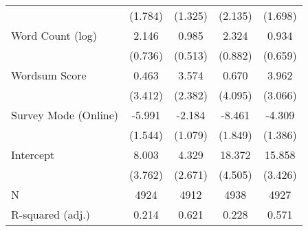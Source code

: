 \begin{table}[h]
\begin{tabular}{lcccc}
   & (1.784) & (1.325) & (2.135) & (1.698) \\ 
  Word Count (log) &   2.146 &   0.985 &   2.324 &   0.934 \\ 
   & (0.736) & (0.513) & (0.882) & (0.659) \\ 
  Wordsum Score &   0.463 &   3.574 &   0.670 &   3.962 \\ 
   & (3.412) & (2.382) & (4.095) & (3.066) \\ 
  Survey Mode (Online) &  -5.991 &  -2.184 &  -8.461 &  -4.309 \\ 
   & (1.544) & (1.079) & (1.849) & (1.386) \\ 
  Intercept &   8.003 &   4.329 &  18.372 &  15.858 \\ 
   & (3.762) & (2.671) & (4.505) & (3.426) \\ 
   \hline
N & 4924 & 4912 & 4938 & 4927 \\ 
  R-squared (adj.) & 0.214 & 0.621 & 0.228 & 0.571 \\ 
   \hline
\end{tabular}
\endgroup
\end{table}
